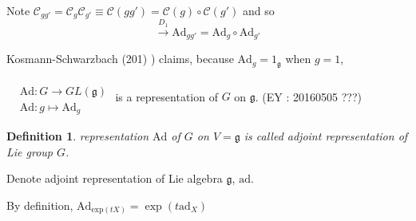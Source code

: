 \documentclass[10pt]{amsart}
\newtheorem{definition}{Definition}
\begin{document}
\begin{multicols*}{2}
Note $\mathcal{C}_{gg'} = \mathcal{C}_g \mathcal{C}_{g'} \equiv \mathcal{C}(gg') = \mathcal{C}(g)\circ \mathcal{C}(g')$ and so 
\[
\xrightarrow{ D_1} \text{Ad}_{gg'} = \text{Ad}_g \circ \text{Ad}_{g'}
\]

Kosmann-Schwarzbach (201) \cite{YKosmann-Schwarzbach2010}) claims, because $\text{Ad}_g = 1_{\mathfrak{g}}$ when $g=1$, 

$\begin{aligned} & \quad \\
  & \text{Ad}:G \to GL(\mathfrak{g}) \\
  & \text{Ad}:g\mapsto \text{Ad}_g\end{aligned}$ is a representation of $G$ on $\mathfrak{g}$.   (EY : 20160505 ???)

\begin{definition}
  representation $\text{Ad}$ of $G$ on $V=\mathfrak{g}$ is called adjoint representation of Lie group $G$.  
\end{definition}

Denote adjoint representation of Lie algebra $\mathfrak{g}$, $\text{ad}$.  

By definition, $\text{Ad}_{\text{exp}(tX)} = \exp{ (t\text{ad}_X)}$


\end{multicols*}
\end{document}
